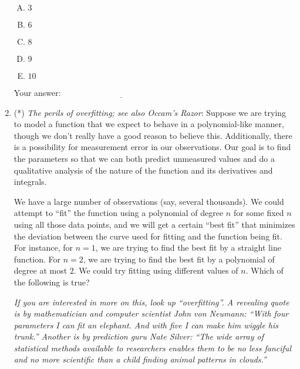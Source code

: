 \documentclass[10pt]{amsart}
\begin{document}
\begin{enumerate}
  \begin{enumerate}[(A)]
  \item $3$
  \item $6$
  \item $8$
  \item $9$
  \item $10$
  \end{enumerate}

  \vspace{0.1in}
  Your answer: $\underline{\qquad\qquad\qquad\qquad\qquad\qquad\qquad}$
  \vspace{0.6in}

\item (*) {\em The perils of overfitting; see also Occam's Razor}:
  Suppose we are trying to model a function that we expect to behave
  in a polynomial-like manner, though we don't really have a good
  reason to believe this. Additionally, there is a possibility for
  measurement error in our observations. Our goal is to find the
  parameters so that we can both predict unmeasured values and do a
  qualitative analysis of the nature of the function and its
  derivatives and integrals.

  We have a large number of observations (say, several thousands). We
  could attempt to ``fit'' the function using a polynomial of degree
  $n$ for some fixed $n$ using all those data points, and we will get
  a certain ``best fit'' that minimizes the deviation between the
  curve used for fitting and the function being fit. For instance, for
  $n = 1$, we are trying to find the best fit by a straight line
  function. For $n = 2$, we are trying to find the best fit by a
  polynomial of degree at most $2$. We could try fitting using
  different values of $n$. Which of the following is true?

  {\em If you are interested in more on this, look up
    ``overfitting''. A revealing quote is by mathematician and
    computer scientist John von Neumann: ``With four parameters I can
    fit an elephant. And with five I can make him wiggle his trunk.''
    Another is by prediction guru Nate Silver: ``The wide array of
    statistical methods available to researchers enables them to be no
    less fanciful and no more scientific than a child finding animal
    patterns in clouds.''}


\end{enumerate}
\end{document}
